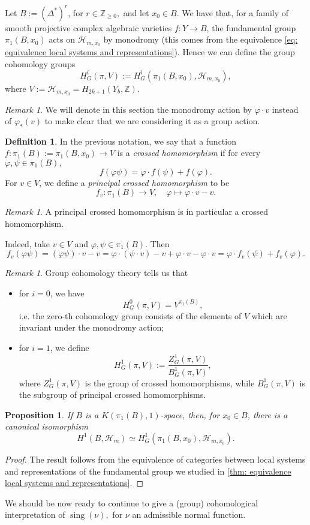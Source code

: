 \documentclass[a4paper,12 pt,titlepage,twoside]{book}
\newcommand{\numberset}{\mathbb}
\newcommand{\Z}{\numberset{Z}}
\DeclareMathOperator{\sing}{sing}
\theoremstyle{plain}
\theoremstyle{theorem}
\newtheorem{prop}[thm]{Proposition}
\theoremstyle{definition}
\newtheorem{defn}[thm]{Definition}
\theoremstyle{remark}
\newtheorem{oss}[thm]{Remark}
\begin{document}
	Let $B:= (\Delta^*)^r$, for $r \in \Z_{\ge 0},$ and let $x_0 \in B.$ We have that, for a family of smooth projective complex algebraic varieties $f \colon Y \rightarrow B$, the fundamental group $\pi_1(B, x_0)$ acts on $\mathcal{H}_{m,x_0}$ by monodromy (this comes from the equivalence \eqref{eq: equivalence local systems and representations}). Hence we can define the group cohomology groups $$H^i_G(\pi, V) := H^i_G(\pi_1(B,x_0), \mathcal{H}_{m,x_0}),$$ where $V := \mathcal{H}_{m,x_0} = H_{2k+1}(Y_b, \Z).$
	\begin{oss}
		We will denote in this section the monodromy action by $\varphi \cdot v$ instead of $\varphi_*(v)$ to make clear that we are considering it as a group action.
	\end{oss}
	\begin{defn}
		In the previous notation, we say that a function $f \colon \pi_1(B):=\pi_1(B,x_0) \rightarrow V$ is a \emph{crossed homomorphism} if for every $\varphi, \psi \in \pi_1(B),$ $$f(\varphi \psi) = \varphi \cdot f(\psi) + f(\varphi).$$ For $v \in V$, we define a \emph{principal crossed homomorphism} to be $$f_v \colon \pi_1(B) \rightarrow V, \quad \varphi \mapsto \varphi \cdot v - v.$$ 
	\end{defn}
	\begin{oss}
		A principal crossed homomorphism is in particular a crossed homomorphism.
	\end{oss}
	Indeed, take $v \in V$ and $\varphi, \psi \in \pi_1(B).$ Then $$f_v(\varphi \psi) = (\varphi \psi) \cdot v -v = \varphi \cdot \left(\psi \cdot v\right) -v + \varphi\cdot v - \varphi \cdot v = \varphi \cdot f_v(\psi) + f_v(\varphi).$$
	\begin{oss}
		Group cohomology theory tells us that \begin{itemize}
			\item for $i=0$, we have $$H^0_G(\pi,V) = V^{\pi_1(B)},$$ i.e. the zero-th cohomology group consists of the elements of $V$ which are invariant under the monodromy action;
			\item for $i=1$, we define $$H^1_G(\pi,V) := \frac{Z^1_G(\pi,V)}{B^1_G(\pi,V)},$$ where $Z^1_G(\pi,V)$ is the group of crossed homomorphisms, while $B^1_G(\pi,V)$ is the subgroup of principal crossed homomorphisms. 
		\end{itemize}
	\end{oss}
	\begin{prop}
		If $B$ is a $K(\pi_1(B),1)$-space, then, for $x_0 \in B$, there is a canonical isomorphism $$H^1(B, \mathcal{H}_m) \simeq H^1_G(\pi_1(B, x_0),\mathcal{H}_{m,x_0}).$$
	\end{prop}
	\begin{proof}
		The result follows from the equivalence of categories between local systems and representations of the fundamental group we studied in \ref{thm: equivalence local systems and representations}.
	\end{proof}
	We should be now ready to continue to give a (group) cohomological interpretation of $\sing(\nu),$ for $\nu$ an admissible normal function.
\end{document}
